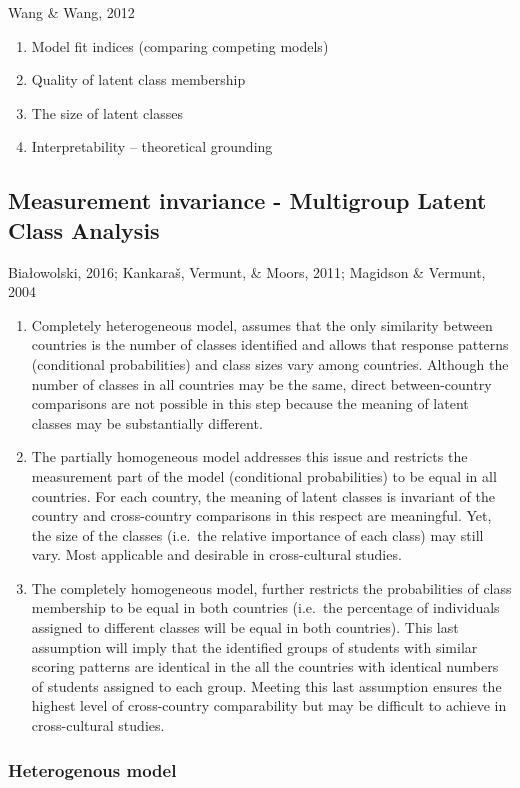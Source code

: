 \documentclass[12pt,twoside]{reedthesis}
\providecommand{\tightlist}{%
  \setlength{\itemsep}{0pt}\setlength{\parskip}{0pt}}
\begin{document}
Wang \& Wang, 2012
\begin{enumerate}
\def\labelenumi{\alph{enumi})}
\tightlist
\item
  Model fit indices (comparing competing models)
\item
  Quality of latent class membership
\item
  The size of latent classes
\item
  Interpretability -- theoretical grounding
\end{enumerate}
\hypertarget{measurement-invariance---multigroup-latent-class-analysis}{%
\subsection{Measurement invariance - Multigroup Latent Class Analysis}\label{measurement-invariance---multigroup-latent-class-analysis}}

Białowolski, 2016; Kankaraš, Vermunt, \& Moors, 2011; Magidson \& Vermunt, 2004
\begin{enumerate}
\def\labelenumi{\arabic{enumi}.}
\tightlist
\item
  Completely heterogeneous model, assumes that the only similarity between countries is the number of classes identified and allows that response patterns (conditional probabilities) and class sizes vary among countries. Although the number of classes in all countries may be the same, direct between-country comparisons are not possible in this step because the meaning of latent classes may be substantially different.
\item
  The partially homogeneous model addresses this issue and restricts the measurement part of the model (conditional probabilities) to be equal in all countries. For each country, the meaning of latent classes is invariant of the country and cross-country comparisons in this respect are meaningful. Yet, the size of the classes (i.e.~the relative importance of each class) may still vary. Most applicable and desirable in cross-cultural studies.
\item
  The completely homogeneous model, further restricts the probabilities of class membership to be equal in both countries (i.e.~the percentage of individuals assigned to different classes will be equal in both countries). This last assumption will imply that the identified groups of students with similar scoring patterns are identical in the all the countries with identical numbers of students assigned to each group. Meeting this last assumption ensures the highest level of cross-country comparability but may be difficult to achieve in cross-cultural studies.
\end{enumerate}
\hypertarget{heterogenous-model}{%
\subsubsection{Heterogenous model}\label{heterogenous-model}}
\end{document}
